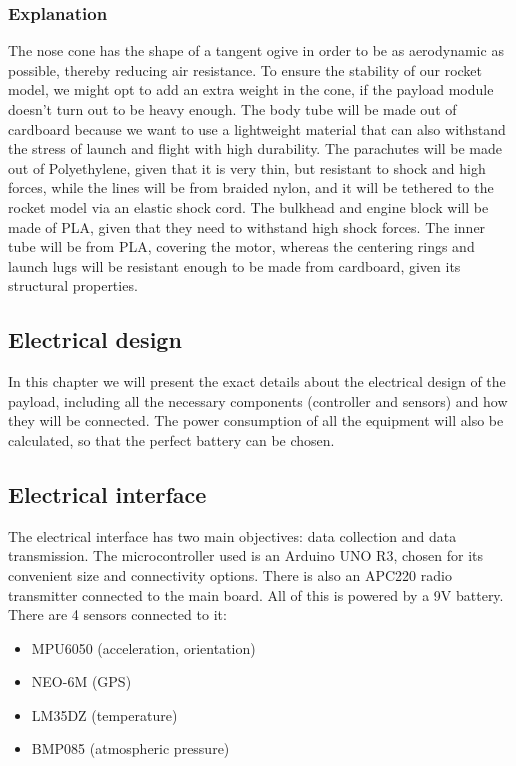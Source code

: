 \subsubsection{Explanation}

The nose cone has the shape of a tangent ogive in order to be as aerodynamic as possible, thereby reducing air resistance. To ensure the stability of our rocket model, we might opt to add an extra weight in the cone, if the payload module doesn’t turn out to be heavy enough. The body tube will be made out of cardboard because we want to use a lightweight material that can also withstand the stress of launch and flight with high durability. The parachutes will be made out of Polyethylene, given that it is very thin, but resistant to shock and high forces, while the lines will be from braided nylon, and it will be tethered to the rocket model via an elastic shock cord. The bulkhead and engine block will be made of PLA, given that they need to withstand high shock forces. The inner tube will be from PLA, covering the motor, whereas the centering rings and launch lugs will be resistant enough to be made from cardboard, given its structural properties.

\subsection{Electrical design}

In this chapter we will present the exact details about the electrical design of the payload, including all the necessary components (controller and sensors) and how they will be connected. The power consumption of all the equipment will also be calculated, so that the perfect battery can be chosen. 

\subsection{Electrical interface}

The electrical interface has two main objectives: data collection and data transmission. The microcontroller used is an Arduino UNO R3, chosen for its convenient size and connectivity options. There is also an APC220 radio transmitter connected to the main board. All of this is powered by a 9V battery. There are 4 sensors connected to it:

\begin{itemize}
    \item MPU6050 (acceleration, orientation)
    \item NEO-6M (GPS)
    \item LM35DZ (temperature)
    \item BMP085 (atmospheric pressure)
\end{itemize}

